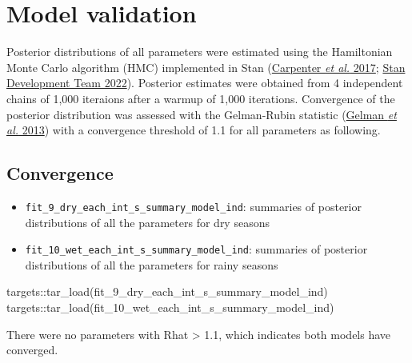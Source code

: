 \documentclass[
  11pt,
  letterpaper,
  DIV=11,
  numbers=noendperiod]{scrartcl}
\newenvironment{Shaded}{}{}
\newcommand{\FunctionTok}[1]{\textcolor[rgb]{0.44,0.26,0.76}{#1}}
\newcommand{\NormalTok}[1]{\textcolor[rgb]{0.14,0.16,0.18}{#1}}
\newcommand{\SpecialCharTok}[1]{\textcolor[rgb]{0.00,0.36,0.77}{#1}}
\begin{document}
\hypertarget{model-validation}{%
\section{Model validation}\label{model-validation}}

Posterior distributions of all parameters were estimated using the
Hamiltonian Monte Carlo algorithm (HMC) implemented in Stan
(\protect\hyperlink{ref-Carpenter2017}{Carpenter \emph{et al.} 2017};
\protect\hyperlink{ref-StanDevelopmentTeam2022}{Stan Development Team
2022}). Posterior estimates were obtained from 4 independent chains of
1,000 iteraions after a warmup of 1,000 iterations. Convergence of the
posterior distribution was assessed with the Gelman-Rubin statistic
(\protect\hyperlink{ref-Gelman2013}{Gelman \emph{et al.} 2013}) with a
convergence threshold of 1.1 for all parameters as following.

\hypertarget{convergence}{%
\subsection{Convergence}\label{convergence}}

\begin{itemize}
\item
  \texttt{fit\_9\_dry\_each\_int\_s\_summary\_model\_ind}: summaries of
  posterior distributions of all the parameters for dry seasons
\item
  \texttt{fit\_10\_wet\_each\_int\_s\_summary\_model\_ind}: summaries of
  posterior distributions of all the parameters for rainy seasons
\end{itemize}

\begin{Shaded}
\begin{Highlighting}[]
\NormalTok{targets}\SpecialCharTok{::}\FunctionTok{tar\_load}\NormalTok{(fit\_9\_dry\_each\_int\_s\_summary\_model\_ind)}
\NormalTok{targets}\SpecialCharTok{::}\FunctionTok{tar\_load}\NormalTok{(fit\_10\_wet\_each\_int\_s\_summary\_model\_ind)}
\end{Highlighting}
\end{Shaded}

There were no parameters with Rhat \textgreater{} 1.1, which indicates
both models have converged.
\end{document}
